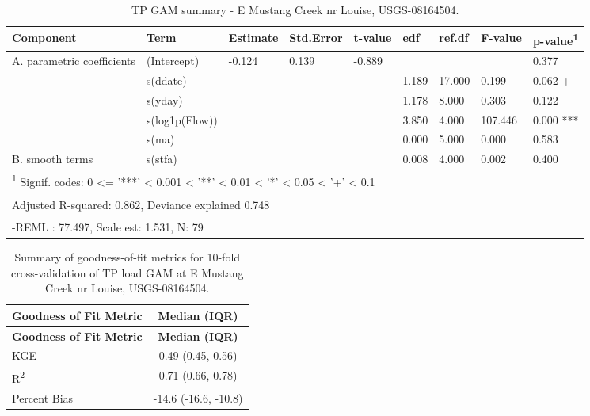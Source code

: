 \documentclass[
]{article}
\newenvironment{widestuff}{\begin{table}[h]\begin{adjustwidth}{-4.5cm}{-4.5cm}\centering}{\end{adjustwidth}\end{table}}
\begin{document}
\begin{widestuff}

\caption{TP GAM summary - E Mustang Creek nr Louise, USGS-08164504.}
\centering
\begin{tabular}[t]{lllllllll}
\toprule
Component & Term & Estimate & Std.Error & t-value & edf & ref.df & F-value & p-value\textsuperscript{1}\\
\midrule
A. parametric coefficients & (Intercept) & -0.124 & 0.139 & -0.889 &  &  &  & 0.377\\
\cmidrule{1-9}
 & s(ddate) &  &  &  & 1.189 & 17.000 & 0.199 & 0.062 +\\

 & s(yday) &  &  &  & 1.178 & 8.000 & 0.303 & 0.122\\

 & s(log1p(Flow)) &  &  &  & 3.850 & 4.000 & 107.446 & 0.000 ***\\

 & s(ma) &  &  &  & 0.000 & 5.000 & 0.000 & 0.583\\

\multirow[t]{-5}{*}{\raggedright\arraybackslash B. smooth terms} & s(stfa) &  &  &  & 0.008 & 4.000 & 0.002 & 0.400\\
\bottomrule
\multicolumn{9}{l}{\textsuperscript{1} Signif. codes: 0 <= '***' < 0.001 < '**' < 0.01 < '*' < 0.05 < '+' < 0.1}\\
\multicolumn{9}{l}{\textsuperscript{} Adjusted R-squared: 0.862, Deviance explained 0.748}\\
\multicolumn{9}{l}{\textsuperscript{} -REML : 77.497, Scale est: 1.531, N: 79}\\
\end{tabular}
\end{widestuff}

\hypertarget{tbl-TP08164504-CV}{}
\begin{longtable}[]{@{}lc@{}}
\caption{\label{tbl-TP08164504-CV}Summary of goodness-of-fit metrics for
10-fold cross-validation of TP load GAM at E Mustang Creek nr Louise,
USGS-08164504.}\tabularnewline
\toprule()
\textbf{Goodness of Fit Metric} & \textbf{Median (IQR)} \\
\midrule()
\endfirsthead
\toprule()
\textbf{Goodness of Fit Metric} & \textbf{Median (IQR)} \\
\midrule()
\endhead
KGE & 0.49 (0.45, 0.56) \\
R\textsuperscript{2} & 0.71 (0.66, 0.78) \\
Percent Bias & -14.6 (-16.6, -10.8) \\
\bottomrule()
\end{longtable}
\end{document}
